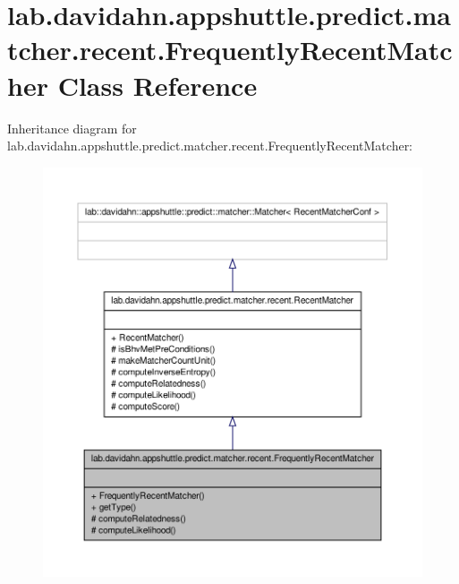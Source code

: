 \hypertarget{classlab_1_1davidahn_1_1appshuttle_1_1predict_1_1matcher_1_1recent_1_1_frequently_recent_matcher}{\section{lab.\-davidahn.\-appshuttle.\-predict.\-matcher.\-recent.\-Frequently\-Recent\-Matcher \-Class \-Reference}
\label{classlab_1_1davidahn_1_1appshuttle_1_1predict_1_1matcher_1_1recent_1_1_frequently_recent_matcher}
}


\-Inheritance diagram for lab.\-davidahn.\-appshuttle.\-predict.\-matcher.\-recent.\-Frequently\-Recent\-Matcher\-:
\nopagebreak
\begin{figure}[H]
\begin{center}
\leavevmode
\includegraphics[width=350pt]{classlab_1_1davidahn_1_1appshuttle_1_1predict_1_1matcher_1_1recent_1_1_frequently_recent_matcher__inherit__graph}
\end{center}
\end{figure}


